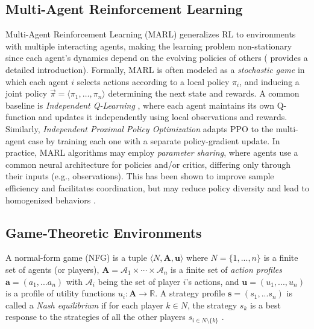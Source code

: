 \documentclass{ecai}
\theoremstyle{plain}
\theoremstyle{definition}
\theoremstyle{remark}
\begin{document}
\subsection{Multi-Agent Reinforcement Learning} \label{sec:marl}
Multi-Agent Reinforcement Learning (MARL) generalizes RL to environments with multiple interacting agents, making the learning problem non-stationary since each agent’s dynamics depend on the evolving policies of others (\citep[][]{marl-book} provides a detailed introduction). Formally, MARL is often modeled as a \textit{stochastic game} in which each agent $i$ selects actions according to a local policy $\pi_i$, and inducing a joint policy $\vec{\pi} = \langle \pi_1, \dots, \pi_n \rangle$ determining the next state and rewards. A common baseline is \textit{Independent Q-Learning} \citep[IQL,][]{tan1993multi}, where each agent maintains its own Q-function and updates it independently using local observations and rewards. Similarly, \textit{Independent Proximal Policy Optimization} \citep[IPPO,][]{de2020independent} adapts PPO to the multi-agent case by training each one with a separate policy-gradient update. In practice, MARL algorithms may employ \textit{parameter sharing}, where agents use a common neural architecture for policies and/or critics, differing only through their inputs (e.g., observations). This has been shown to improve sample efficiency and facilitates coordination, but may reduce policy diversity and lead to homogenized behaviors \citep{marl-book, gupta2017cooperative}. 


\subsection{Game-Theoretic Environments} \label{sec:prelims:gt}



A {normal-form game} (NFG) is a tuple $\langle N,\mathbf{A},\mathbf{u}\rangle$ where
 $N=\{1,...,n\}$ is a finite set of agents (or players), $\mathbf{A}=\mathcal{A}_1\times\cdots\times \mathcal{A}_n$ is a finite set of \emph{action profiles} $\mathbf{a}=(a_1,...a_n)$ with $\mathcal{A}_i$ being the set of player $i$'s actions, and $\mathbf{u}=(u_1,...,u_n)$ is a profile of utility functions $u_i:\mathbf{A}\rightarrow\mathbb{R}$. A strategy profile $\mathbf{s}=(s_1,...s_n)$ is called a \emph{Nash equilibrium} if for each player $k\in N$, the strategy $s_k$ is a best response to the strategies of all the other players $s_{i\in N\setminus\{k\}}$ \citep{leyton2022essentials, maschler2020game}.%
\end{document}
